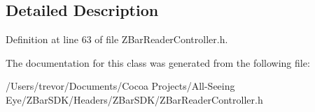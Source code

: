 \subsection{Detailed Description}


Definition at line 63 of file ZBarReaderController.h.



The documentation for this class was generated from the following file:\begin{DoxyCompactItemize}
\item 
/Users/trevor/Documents/Cocoa Projects/All-\/Seeing Eye/ZBarSDK/Headers/ZBarSDK/ZBarReaderController.h\end{DoxyCompactItemize}
